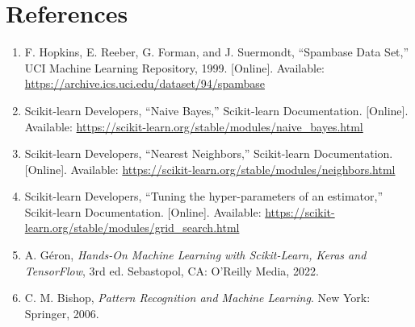 \documentclass[12pt,a4paper]{article}
\begin{document}
\section{References}
\begin{enumerate}
\item F. Hopkins, E. Reeber, G. Forman, and J. Suermondt, ``Spambase Data Set,'' UCI
Machine Learning Repository, 1999. [Online]. Available:
\url{https://archive.ics.uci.edu/dataset/94/spambase}
\item Scikit-learn Developers, ``Naive Bayes,'' Scikit-learn Documentation. [Online].
Available: \url{https://scikit-learn.org/stable/modules/naive_bayes.html}
\item Scikit-learn Developers, ``Nearest Neighbors,'' Scikit-learn Documentation.
[Online]. Available: \url{https://scikit-learn.org/stable/modules/neighbors.html}
\item Scikit-learn Developers, ``Tuning the hyper-parameters of an estimator,''
Scikit-learn Documentation. [Online]. Available:
\url{https://scikit-learn.org/stable/modules/grid_search.html}
\item A. G\'eron, \textit{Hands-On Machine Learning with Scikit-Learn, Keras and
TensorFlow}, 3rd ed. Sebastopol, CA: O'Reilly Media, 2022.
\item C. M. Bishop, \textit{Pattern Recognition and Machine Learning}. New York:
Springer, 2006.
\end{enumerate}
\end{document}
